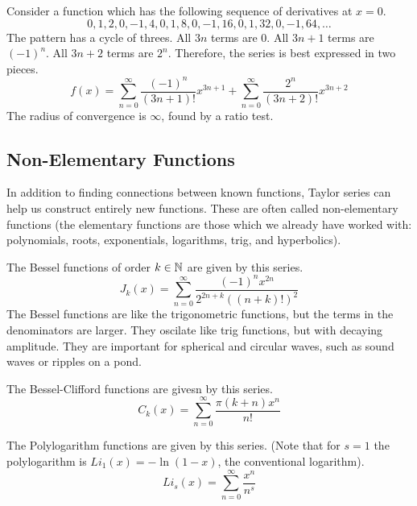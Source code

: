 \documentclass[fleqn]{report}
\begin{document}
\begin{example}
Consider a function which has the following sequence of
derivatives at $x=0$.
\begin{equation*}
0, 1, 2, 0, -1, 4, 0, 1, 8, 0, -1, 16, 0, 1, 32, 0, -1, 64,
\ldots
\end{equation*}
The pattern has a cycle of threes. All $3n$ terms are 0. All
$3n+1$ terms are $(-1)^n$. All $3n+2$ terms are $2^n$.
Therefore, the series is best expressed in two pieces.
\begin{equation*}
f(x) = 
\sum_{n=0}^\infty \frac{(-1)^n}{(3n+1)!} x^{3n+1} + 
\sum_{n=0}^\infty \frac{2^n}{(3n+2)!} x^{3n+2} 
\end{equation*}
The radius of convergence is $\infty$, found by a ratio test.
\end{example}

\subsection{Non-Elementary Functions}
\label{non-elementary-functions}

In addition to finding connections between known functions,
Taylor series can help us construct entirely new functions.
These are often called non-elementary functions (the
elementary functions are those which we already have worked
with: polynomials, roots, exponentials, logarithms, trig, and 
hyperbolics). 

\begin{example}
The Bessel functions of order $k \in \mathbb{N}$ are given by this
series.
\begin{equation*}
J_k(x) = \sum_{n=0}^\infty \frac{(-1)^n x^{2n}}{2^{2n+k}
((n+k)!)^2}
\end{equation*}
The Bessel functions are like the trigonometric functions, but the
terms in the denominators are larger. They oscilate like trig
functions, but with decaying amplitude. They are important
for spherical and circular waves, such as sound waves or
ripples on a pond.
\end{example}

\begin{example}
The Bessel-Clifford functions are givesn by this series.
\begin{equation*}
C_k(x) = \sum_{n=0}^\infty \frac{\pi (k+n) x^n}{n!}
\end{equation*}
\end{example}

\begin{example}
The Polylogarithm functions are given by this series.
(Note that for $s=1$ the polylogarithm is $Li_1(x) =
-\ln (1-x)$, the conventional logarithm).
\begin{equation*}
Li_s(x) = \sum_{n=0}^\infty \frac{x^{n}}{n^s}
\end{equation*}
\end{example}
\end{document}
